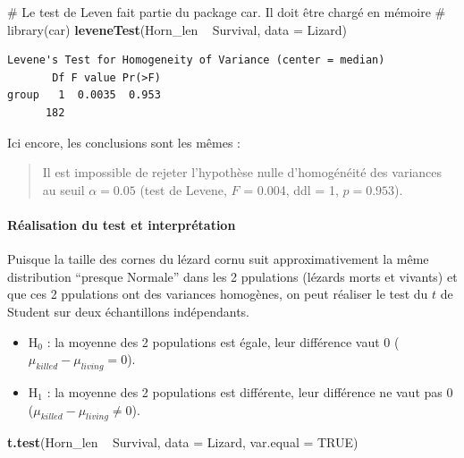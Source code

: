 \documentclass[a4paperpaper,]{article}
\newenvironment{Shaded}{\begin{snugshade}}{\end{snugshade}}
\newcommand{\CommentTok}[1]{\textcolor[rgb]{0.54,0.53,0.53}{#1}}
\newcommand{\DataTypeTok}[1]{\textcolor[rgb]{0.00,0.34,0.68}{#1}}
\newcommand{\KeywordTok}[1]{\textcolor[rgb]{0.12,0.11,0.11}{\textbf{#1}}}
\newcommand{\NormalTok}[1]{\textcolor[rgb]{0.12,0.11,0.11}{#1}}
\newcommand{\OperatorTok}[1]{\textcolor[rgb]{0.12,0.11,0.11}{#1}}
\newcommand{\OtherTok}[1]{\textcolor[rgb]{0.00,0.43,0.16}{#1}}
\newcommand{\StringTok}[1]{\textcolor[rgb]{0.75,0.01,0.01}{#1}}
\providecommand{\tightlist}{%
  \setlength{\itemsep}{0pt}\setlength{\parskip}{0pt}}
\let\oldparagraph\paragraph
\renewcommand{\paragraph}[1]{\oldparagraph{#1}\mbox{}}
\begin{document}
\begin{Shaded}
\begin{Highlighting}[]
\CommentTok{# Le test de Leven fait partie du package car. Il doit être chargé en mémoire}
\CommentTok{# library(car)}
\KeywordTok{leveneTest}\NormalTok{(Horn_len }\OperatorTok{~}\StringTok{ }\NormalTok{Survival, }\DataTypeTok{data =}\NormalTok{ Lizard)}
\end{Highlighting}
\end{Shaded}

\begin{verbatim}
Levene's Test for Homogeneity of Variance (center = median)
       Df F value Pr(>F)
group   1  0.0035  0.953
      182               
\end{verbatim}

Ici encore, les conclusions sont les mêmes :

\begin{quote}
Il est impossible de rejeter l'hypothèse nulle d'homogénéité des variances au seuil \(\alpha = 0.05\) (test de Levene, \(F\) = 0.004, ddl = 1, \(p = 0.953\)).
\end{quote}

\hypertarget{realisation-du-test-et-interpretation-2}{%
\paragraph{Réalisation du test et interprétation}\label{realisation-du-test-et-interpretation-2}}

Puisque la taille des cornes du lézard cornu suit approximativement la même distribution ``presque Normale'' dans les 2 ppulations (lézards morts et vivants) et que ces 2 ppulations ont des variances homogènes, on peut réaliser le test du \(t\) de Student sur deux échantillons indépendants.

\begin{itemize}
\tightlist
\item
  H\(_0\) : la moyenne des 2 populations est égale, leur différence vaut 0 (\(\mu_{killed}-\mu_{living} = 0\)).
\item
  H\(_1\) : la moyenne des 2 populations est différente, leur différence ne vaut pas 0 (\(\mu_{killed}-\mu_{living} \neq 0\)).
\end{itemize}

\begin{Shaded}
\begin{Highlighting}[]
\KeywordTok{t.test}\NormalTok{(Horn_len }\OperatorTok{~}\StringTok{ }\NormalTok{Survival, }\DataTypeTok{data =}\NormalTok{ Lizard, }\DataTypeTok{var.equal =} \OtherTok{TRUE}\NormalTok{)}
\end{Highlighting}
\end{Shaded}
\end{document}
